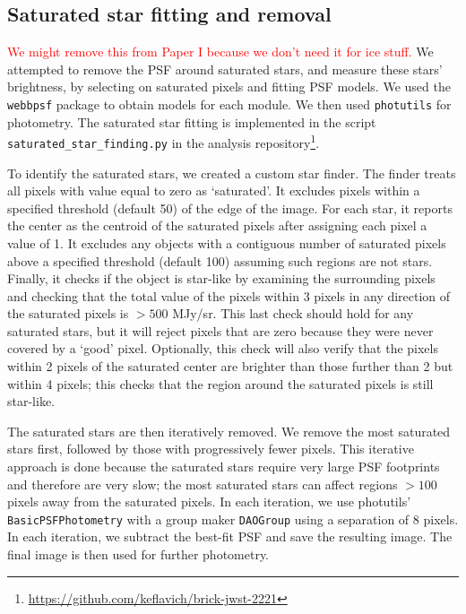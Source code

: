 \subsection{Saturated star fitting and removal}
\label{sec:satstar}
\textcolor{red}{We might remove this from Paper I because we don't need it for ice stuff.}
We attempted to remove the PSF around saturated stars, and measure these stars' brightness, by selecting on saturated pixels and fitting PSF models.
We used the \texttt{webbpsf} package to obtain models for each module.
We then used \texttt{photutils} for photometry.
The saturated star fitting is implemented in the script \texttt{saturated\_star\_finding.py} in the analysis repository\footnote{\url{https://github.com/keflavich/brick-jwst-2221}}.

To identify the saturated stars, we created a custom star finder.
The finder treats all pixels with value equal to zero as `saturated'.
It excludes pixels within a specified threshold (default 50) of the edge of the image.
For each star, it reports the center as the centroid of the saturated pixels after assigning each pixel a value of 1.
It excludes any objects with a contiguous number of saturated pixels above a specified threshold (default 100) assuming such regions are not stars.
Finally, it checks if the object is star-like by examining the surrounding pixels and checking that the total value of the pixels within 3 pixels in any direction of the saturated pixels is $>500$ MJy/sr.
This last check should hold for any saturated stars, but it will reject pixels that are zero because they were never covered by a `good' pixel.
Optionally, this check will also verify that the pixels within 2 pixels of the saturated center are brighter than those further than 2 but within 4 pixels; this checks that the region around the saturated pixels is still star-like.

The saturated stars are then iteratively removed.
We remove the most saturated stars first, followed by those with progressively fewer pixels.
This iterative approach is done because the saturated stars require very large PSF footprints and therefore are very slow;
the most saturated stars can affect regions $>100$ pixels away from the saturated pixels.
In each iteration, we use photutils' \texttt{BasicPSFPhotometry} with a group maker \texttt{DAOGroup} using a separation of 8 pixels.
In each iteration, we subtract the best-fit PSF and save the resulting image.
The final image is then used for further photometry.